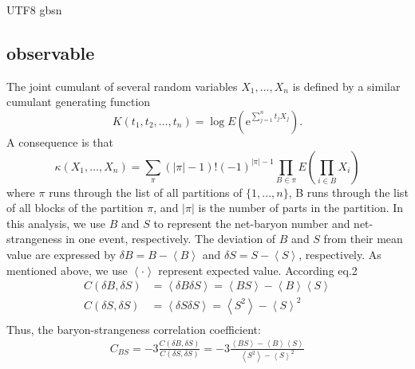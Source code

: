\documentclass[twocolumn,showpacs,preprintnumbers,superscriptaddress,amsmath,amssymb]{revtex4}
\begin{document}
\begin{CJK*} {UTF8} {gbsn}
\begin{appendices}
	\section{observable} 
	The joint cumulant of several random variables $X_{1}, ..., X_{n}$ is defined by a similar cumulant generating function
	\begin{equation}
K\left(t_{1}, t_{2}, \ldots, t_{n}\right)=\log E\left(\mathrm{e}^{\sum_{j=1}^{n} t_{j} X_{j}}\right).
\end{equation}
	 A consequence is that
	 \begin{equation}
\kappa\left(X_{1}, \ldots, X_{n}\right)=\sum_{\pi}(|\pi|-1) !(-1)^{|\pi|-1} \prod_{B \in \pi} E\left(\prod_{i \in B} X_{i}\right)
\end{equation}
where $\pi$ runs through the list of all partitions of $\{ 1, ..., n \}$, B runs through the list of all blocks of the partition $\pi$, and $|\pi|$ is the number of parts in the partition.
In this analysis, we use $B$ and $S$ to represent the net-baryon number and net-strangeness in one event, respectively.
The deviation of $B$ and $S$ from their mean value are expressed by $\delta B = B - \left\langle B \right\rangle$ and $\delta S = S -\left\langle S \right\rangle$, respectively. 
As mentioned above, we use $\left\langle \cdot \right\rangle$ represent expected value.
 According eq.2
\begin{equation}
\begin{aligned}
C(\delta B,\delta S) &=  \left\langle \delta B \delta S \right\rangle = \left\langle BS \right\rangle - \left\langle B \right\rangle \left\langle S \right\rangle\\
C(\delta S,\delta S) &=  \left\langle \delta S \delta S \right\rangle = \left\langle S^{2} \right\rangle - \left\langle S \right\rangle^{2}\\
			\end{aligned}
\end{equation}
Thus, the baryon-strangeness correlation coefficient:
\begin{equation}
\begin{aligned}
C_{BS} = -3\frac{C(\delta B,\delta S)}{C(\delta S,\delta S)} = -3\frac{\left\langle BS \right\rangle - \left\langle B \right\rangle \left\langle S \right\rangle}{\left\langle S^{2}  \right\rangle - \left\langle S \right\rangle^{2}}
			\end{aligned}
\end{equation}
\end{appendices}
	

\end{CJK*}
\end{document}
